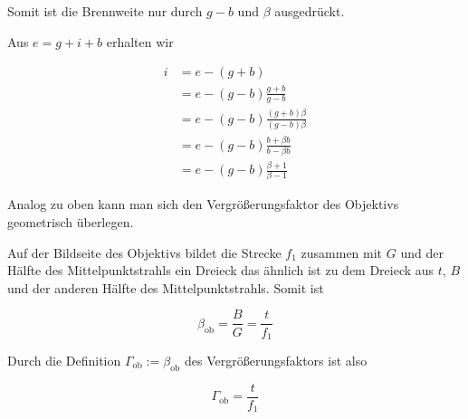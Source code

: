 \documentclass[a4paper,german,12pt,smallheadings]{scrartcl}
\begin{document}
Somit ist die Brennweite nur durch $g-b$ und $\beta$ ausgedrückt.

Aus $e = g + i + b$ erhalten wir

\begin{align*}
  i &= e - (g+b) \\
    &= e - (g-b) \frac{g+b}{g-b} \\
    &= e - (g-b) \frac{(g+b)\beta}{(g-b)\beta} \\
    &= e - (g-b) \frac{b + \beta b}{b - \beta b} \\
    &= e - (g-b) \frac{\beta + 1}{\beta - 1}
\end{align*}


Analog zu oben kann man sich den Vergrößerungsfaktor des Objektivs geometrisch
überlegen.

Auf der Bildseite des Objektivs bildet die Strecke $f_1$ zusammen mit $G$ und
der Hälfte des Mittelpunktstrahls ein Dreieck das ähnlich ist zu dem Dreieck
aus $t$, $B$ und der anderen Hälfte des Mittelpunktstrahls. Somit ist

\begin{equation}
  \beta_\text{ob} = \frac{B}{G} = \frac{t}{f_1}
\end{equation}

Durch die Definition $\Gamma_\text{ob} := \beta_\text{ob}$ des
Vergrößerungsfaktors ist also

\begin{equation}
  \Gamma_\text{ob} = \frac{t}{f_1}
\end{equation}

\end{document}
